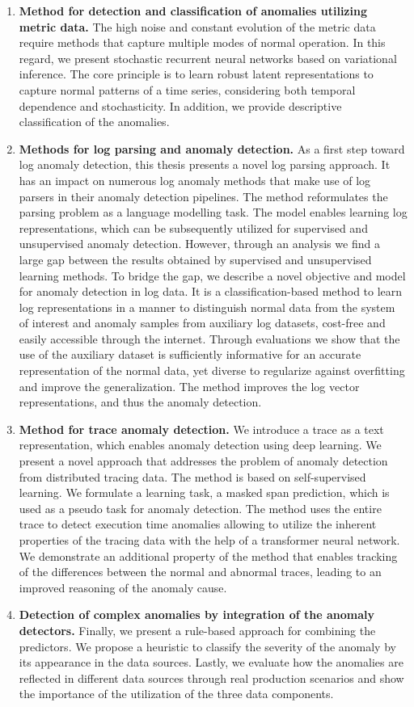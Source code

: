 \begin{enumerate}
    \item \textbf{Method for detection and classification of anomalies utilizing metric data.} The high noise and constant evolution of the metric data require methods that capture multiple modes of normal operation. In this regard, we present stochastic recurrent neural networks based on variational inference. The core principle is to learn robust latent representations to capture normal patterns of a time series, considering both temporal dependence and stochasticity. In addition, we provide descriptive classification of the anomalies.
    \item \textbf{Methods for log parsing and anomaly detection.} As a first step toward log anomaly detection, this thesis presents a novel log parsing approach. It has an impact on numerous log anomaly methods that make use of log parsers in their anomaly detection pipelines. The method reformulates the parsing problem as a language modelling task. The model enables learning log representations, which can be subsequently utilized for supervised and unsupervised anomaly detection. However, through an analysis we find a large gap between the results obtained by supervised and unsupervised learning methods. To bridge the gap, we describe a novel objective and model for anomaly detection in log data. It is a classification-based method to learn log representations in a manner to distinguish normal data from the system of interest and anomaly samples from auxiliary log datasets, cost-free and easily accessible through the internet. Through evaluations we show that the use of the auxiliary dataset is sufficiently informative for an accurate representation of the normal data, yet diverse to regularize against overfitting and improve the generalization. The method improves the log vector representations, and thus the anomaly detection.
    \item \textbf{Method for trace anomaly detection.} We introduce a trace as a text representation, which enables anomaly detection using deep learning. We present a novel approach that addresses the problem of anomaly detection from distributed tracing data. The method is based on self-supervised learning. We formulate a learning task, a masked span prediction, which is used as a pseudo task for anomaly detection. The method uses the entire trace to detect execution time anomalies allowing to utilize the inherent properties of the tracing data with the help of a transformer neural network. We demonstrate an additional property of the method that enables tracking of the differences between the normal and abnormal traces, leading to an improved reasoning of the anomaly cause.
    \item \textbf{Detection of complex anomalies by integration of the anomaly detectors.} Finally, we present a rule-based approach for combining the predictors. We propose a heuristic to classify the severity of the anomaly by its appearance in the data sources. Lastly, we evaluate how the anomalies are reflected in different data sources through real production scenarios and show the importance of the utilization of the three data components. 
\end{enumerate}

